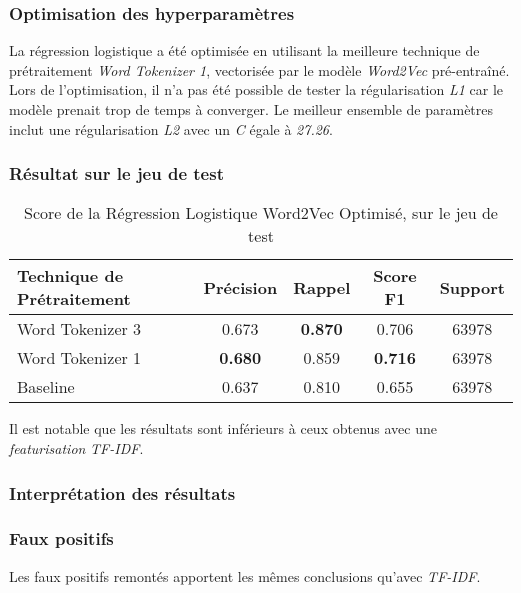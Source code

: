 \subsubsection{Optimisation des hyperparamètres}
La régression logistique a été optimisée en utilisant la meilleure technique de prétraitement \textit{Word Tokenizer 1}, vectorisée par le modèle \textit{Word2Vec} pré-entraîné. 
Lors de l'optimisation, il n'a pas été possible de tester la régularisation \textit{L1} car le modèle prenait trop de temps à converger.
Le meilleur ensemble de paramètres inclut une régularisation \textit{L2} avec un \textit{C} égale à \textit{27.26}.


\subsubsection{Résultat sur le jeu de test}
\begin{table}[ht]
    \centering
    \caption{Score de la Régression Logistique Word2Vec Optimisé, sur le jeu de test}
    \begin{tabular}{lcccc}
    \hline
    \textbf{Technique de Prétraitement} & \textbf{Précision} & \textbf{Rappel} & \textbf{Score F1} & \textbf{Support} \\ \hline
    Word Tokenizer 3                          & 0.673              & \textbf{0.870}           & 0.706            & 63978            \\\hline
    Word Tokenizer 1                          & \textbf{0.680}              & 0.859           & \textbf{0.716}             & 63978            \\\hline
    Baseline                   & 0.637              & 0.810           & 0.655             & 63978            \\ \hline
\end{tabular}
\label{tab:results}
\end{table}

Il est notable que les résultats sont inférieurs à ceux obtenus avec une \textit{featurisation} \textit{TF-IDF}.

\subsubsection{Interprétation des résultats}
\subsubsection{Faux positifs}
Les faux positifs remontés apportent les mêmes conclusions qu'avec \textit{TF-IDF}.


